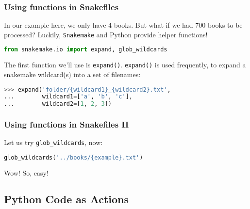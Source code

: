 \begin{frame}[fragile]
  \frametitle{Using functions in Snakefiles}
  In our example here, we only have 4 books. But what if we had 700 books to be processed? \newline
  Luckily, \texttt{Snakemake} and Python provide helper functions!
  \begin{lstlisting}[language=Python,style=Python]
from snakemake.io import expand, glob_wildcards
  \end{lstlisting}
  The first function we’ll use is \texttt{expand()}. \texttt{expand()} is used frequently, to expand a snakemake wildcard(s) into a set of filenames:
  \begin{lstlisting}[language=Python,style=Python]
>>> expand('folder/{wildcard1}_{wildcard2}.txt',
...        wildcard1=['a', 'b', 'c'],
...        wildcard2=[1, 2, 3])
  \end{lstlisting}
\end{frame}

\begin{frame}[fragile]
  \frametitle{Using functions in Snakefiles II}
  \pause
  \pause
  Let us try \texttt{glob\_wildcards}, now:
  \begin{lstlisting}[language=Python,style=Python]
glob_wildcards('../books/{example}.txt')
  \end{lstlisting}
  \pause
  Wow! So, easy!
\end{frame}

\subsection{Python Code as Actions}

